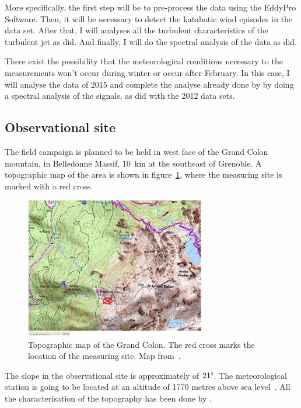 \documentclass[a4paper,12pt]{article}
\begin{document}
More specifically, the first step will be to pre-process the data using the EddyPro Software. Then, it will be necessary to detect the katabatic wind episodes in the data set. After that, I will analyses all the turbulent characteristics of the turbulent jet as \cite{jakob} did. And finally, I will do the spectral analysis of the data as \cite{claudine} did. 

There exist the possibility that the meteorological conditions necessary to the measurements won't occur during winter or occur after February. In this case, I will analyse the data of 2015 and complete the analyse already done by \cite{jakob} by doing a spectral analysis of the signals, as \cite{claudine} did with the 2012 data sets.

\subsection{Observational site}

The field campaign is planned to be held in west face of the Grand Colon mountain, in Belledonne Massif, 10~km at the southeast of Grenoble. A topographic map of the area is shown in figure~\ref{fig:obs_site}, where the measuring site is marked with a red cross.

\begin{figure}[!ht]
  \begin{center}
  \includegraphics[width=0.7\textwidth]{fig/grand_colon_jakob.png}
  \caption{Topographic map of the Grand Colon. The red cross marks the location of the measuring site. Map from~\cite{jakob}.}
  \label{fig:obs_site}
  \end{center}
\end{figure}

The slope in the observational site is approximately of $21\degree$. The meteorological station is going to be located at an altitude of 1770 metres above sea level~\citep{claudine}. All the characterisation of the topography has been done by \cite{alban}.
\end{document}
